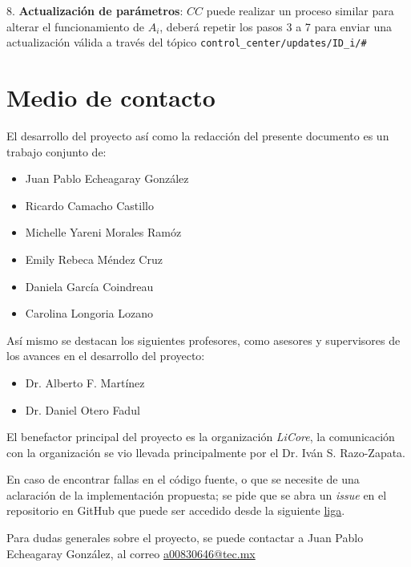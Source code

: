 \documentclass{article}
\begin{document}
            8. \textbf{Actualización de parámetros}: $CC$ puede realizar un proceso similar para alterar el funcionamiento de $A_i$, deberá repetir los pasos 3 a 7 para enviar una actualización válida a través del tópico \texttt{control\_center/updates/ID\_i/\#}

    \section{Medio de contacto}\label{sec:contact}

        El desarrollo del proyecto así como la redacción del presente documento es un trabajo conjunto de:
        \begin{itemize}[noitemsep]
            \item Juan Pablo Echeagaray González
            \item Ricardo Camacho Castillo
            \item Michelle Yareni Morales Ramóz
            \item Emily Rebeca Méndez Cruz
            \item Daniela García Coindreau
            \item Carolina Longoria Lozano
        \end{itemize}

        Así mismo se destacan los siguientes profesores, como asesores y supervisores de los avances en el desarrollo del proyecto:
        \begin{itemize}[noitemsep]
            \item Dr. Alberto F. Martínez
            \item Dr. Daniel Otero Fadul
        \end{itemize}

        El benefactor principal del proyecto es la organización \textit{LiCore}, la comunicación con la organización se vio llevada principalmente por el Dr. Iván S. Razo-Zapata.

        En caso de encontrar fallas en el código fuente, o que se necesite de una aclaración de la implementación propuesta; se pide que se abra un \textit{issue} en el repositorio en GitHub que puede ser accedido desde la siguiente \href{https://github.com/JuanEcheagaray75/licore-pki}{liga}.

        Para dudas generales sobre el proyecto, se puede contactar a Juan Pablo Echeagaray González, al correo \href{mailto:a00830646@tec.mx}{a00830646@tec.mx}

    \clearpage
    
    
\end{document}
